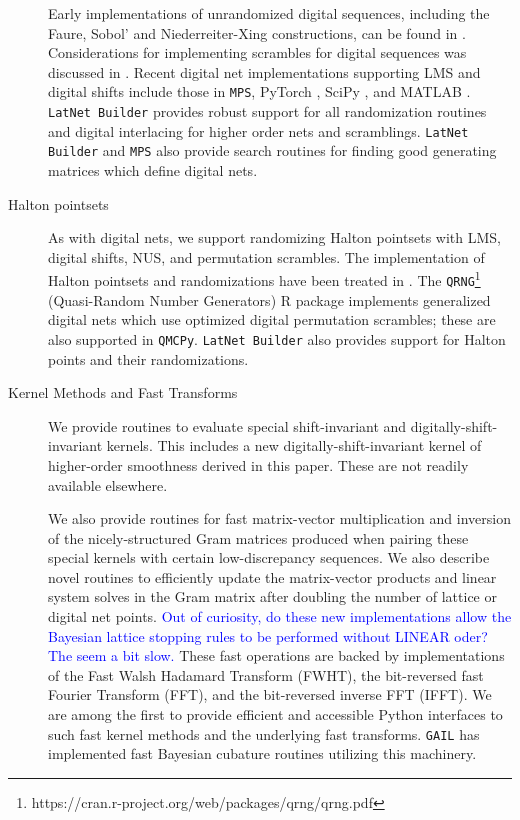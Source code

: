 \documentclass[acmsmall]{acmart}
\newcommand{\FJHNote}[1]{\textcolor{blue}{#1}}
\begin{document}
\begin{description}
    Early implementations of unrandomized digital sequences, including the Faure, Sobol' and Niederreiter-Xing constructions, can be found in \citep{fox1986algorithm,bratley1992implementation,bratley2003implementing,pirsic2002software}. Considerations for implementing scrambles for digital sequences was discussed in \citep{hong2003algorithm}. Recent digital net implementations supporting LMS and digital shifts  include those in \texttt{MPS}, PyTorch \citep{paszke2019pytorch}, SciPy \citep{virtanen2020scipy}, and MATLAB \citep{MATLAB}. \texttt{LatNet Builder} provides robust support for all randomization routines and digital interlacing for higher order nets and scramblings. \texttt{LatNet Builder} and \texttt{MPS} also provide search routines for finding good generating matrices which define digital nets. 
    \item[Halton pointsets] As with digital nets, we support randomizing Halton pointsets with LMS, digital shifts, NUS, and permutation scrambles. The implementation of Halton pointsets and randomizations have been treated in \citep{owen_halton,wang2000randomized}. The \texttt{QRNG}\footnote{https://cran.r-project.org/web/packages/qrng/qrng.pdf} (Quasi-Random Number Generators) R package \citep{qrng.software} implements generalized digital nets which use optimized digital permutation scrambles; these are also supported in \texttt{QMCPy}. \texttt{LatNet Builder} also provides support for Halton points and their randomizations. 
    \item[Kernel Methods and Fast Transforms] We provide routines to evaluate special shift-invariant and digitally-shift-invariant kernels. This includes a new digitally-shift-invariant kernel of higher-order smoothness derived in this paper. These are not readily available elsewhere. 
    
    We also provide routines for fast matrix-vector multiplication and inversion of the nicely-structured Gram matrices produced when pairing these special kernels with certain low-discrepancy sequences. We also describe novel routines to efficiently update the matrix-vector products and linear system solves in the Gram matrix after doubling the number of lattice or digital net points. \FJHNote{Out of curiosity, do these new implementations allow the Bayesian lattice stopping rules to be performed without LINEAR oder?  The seem a bit slow.} These fast operations are backed by implementations of the Fast Walsh Hadamard Transform (FWHT), the bit-reversed fast Fourier Transform (FFT), and the bit-reversed inverse FFT (IFFT). We are among the first to provide efficient and accessible Python interfaces to such fast kernel methods and the underlying fast transforms. \texttt{GAIL} has implemented fast Bayesian cubature routines utilizing this machinery. 
\end{description}
\end{document}
